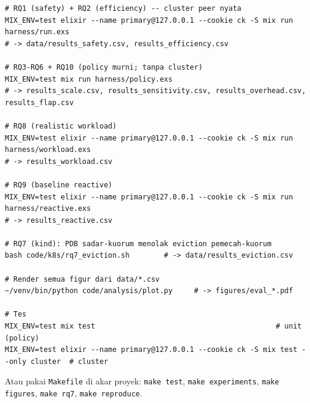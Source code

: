 \documentclass[11pt]{article}
\newcommand{\code}[1]{\texttt{\small #1}}
\begin{document}
\begin{lstlisting}[style=sh]
# RQ1 (safety) + RQ2 (efficiency) -- cluster peer nyata
MIX_ENV=test elixir --name primary@127.0.0.1 --cookie ck -S mix run harness/run.exs
# -> data/results_safety.csv, results_efficiency.csv

# RQ3-RQ6 + RQ10 (policy murni; tanpa cluster)
MIX_ENV=test mix run harness/policy.exs
# -> results_scale.csv, results_sensitivity.csv, results_overhead.csv, results_flap.csv

# RQ8 (realistic workload)
MIX_ENV=test elixir --name primary@127.0.0.1 --cookie ck -S mix run harness/workload.exs
# -> results_workload.csv

# RQ9 (baseline reactive)
MIX_ENV=test elixir --name primary@127.0.0.1 --cookie ck -S mix run harness/reactive.exs
# -> results_reactive.csv

# RQ7 (kind): PDB sadar-kuorum menolak eviction pemecah-kuorum
bash code/k8s/rq7_eviction.sh        # -> data/results_eviction.csv

# Render semua figur dari data/*.csv
~/venv/bin/python code/analysis/plot.py     # -> figures/eval_*.pdf

# Tes
MIX_ENV=test mix test                                          # unit (policy)
MIX_ENV=test elixir --name primary@127.0.0.1 --cookie ck -S mix test --only cluster  # cluster
\end{lstlisting}
Atau pakai \code{Makefile} di akar proyek: \code{make test}, \code{make experiments},
\code{make figures}, \code{make rq7}, \code{make reproduce}.

\end{document}
